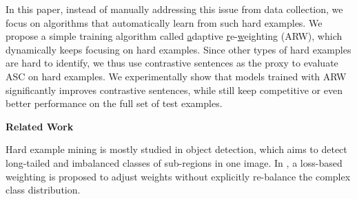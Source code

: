 In this paper, instead of manually addressing this issue from data collection, we focus on algorithms that automatically learn from such hard examples. 
We propose a simple training algorithm called \underline{a}daptive \underline{r}e-\underline{w}eighting (ARW), which dynamically keeps focusing on hard examples.
Since other types of hard examples are hard to identify, we thus use contrastive sentences as the proxy to evaluate ASC on hard examples.
We experimentally show that models trained with ARW significantly improves contrastive sentences, while still keep competitive or even better performance on the full set of test examples.

\textbf{Related Work}

Hard example mining is mostly studied in object detection\cite{shrivastava2016training,lin2017focal}, which aims to detect long-tailed and imbalanced classes of sub-regions in one image.
In \cite{lin2017focal}, a loss-based weighting is proposed to adjust weights without explicitly re-balance the complex class distribution. 


